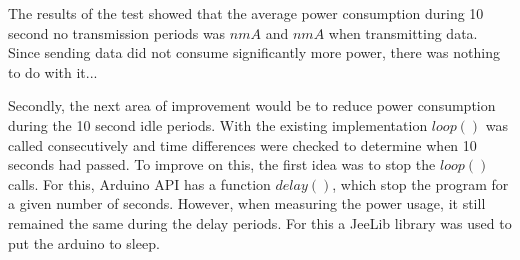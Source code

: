 The results of the test showed that the average power consumption during 10 second no transmission periods was $n mA$ and $n mA$ when transmitting data. Since sending data did not consume significantly more power, there was nothing to do with it... 

Secondly, the next area of improvement would be to reduce power consumption during the 10 second idle periods. With the existing implementation $loop()$ was called consecutively and time differences were checked to determine when 10 seconds had passed. To improve on this, the first idea was to stop the $loop()$ calls. For this, Arduino API has a function $delay()$, which stop the program for a given number of seconds. However, when measuring the power usage, it still remained the same during the delay periods. For this  a JeeLib library was used to put the arduino to sleep.




